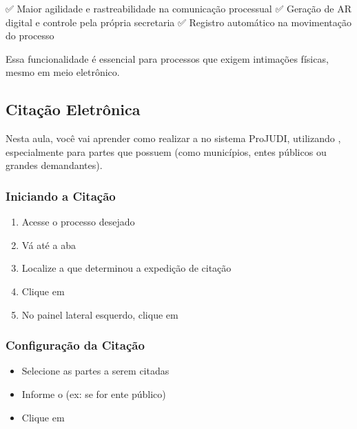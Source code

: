 \documentclass[letterpaper,10pt,brazil]{sphinxmanual}
\begin{document}
\sphinxAtStartPar
✅ Maior agilidade e rastreabilidade na comunicação processual
✅ Geração de AR digital e controle pela própria secretaria
✅ Registro automático na movimentação do processo

\sphinxAtStartPar
Essa funcionalidade é essencial para processos que exigem intimações físicas, mesmo em meio eletrônico.

\sphinxstepscope


\subsection{Citação Eletrônica}
\label{\detokenize{projud_30_cita_xe7_xe3oeletronica:citacao-eletronica}}\label{\detokenize{projud_30_cita_xe7_xe3oeletronica::doc}}
\sphinxAtStartPar
Nesta aula, você vai aprender como realizar a  no sistema ProJUDI, utilizando , especialmente para partes que possuem  (como municípios, entes públicos ou grandes demandantes).


\subsubsection{Iniciando a Citação}
\label{\detokenize{projud_30_cita_xe7_xe3oeletronica:iniciando-a-citacao}}\begin{enumerate}
%
\item {} 
\sphinxAtStartPar
Acesse o processo desejado

\item {} 
\sphinxAtStartPar
Vá até a aba 

\item {} 
\sphinxAtStartPar
Localize a  que determinou a expedição de citação

\item {} 
\sphinxAtStartPar
Clique em 

\item {} 
\sphinxAtStartPar
No painel lateral esquerdo, clique em 

\end{enumerate}


\subsubsection{Configuração da Citação}
\label{\detokenize{projud_30_cita_xe7_xe3oeletronica:configuracao-da-citacao}}\begin{itemize}
\item {} 
\sphinxAtStartPar
Selecione as partes a serem citadas

\item {} 
\sphinxAtStartPar
Informe o  (ex:  se for ente público)

\item {} 
\sphinxAtStartPar
Clique em 

\end{itemize}
\end{document}
